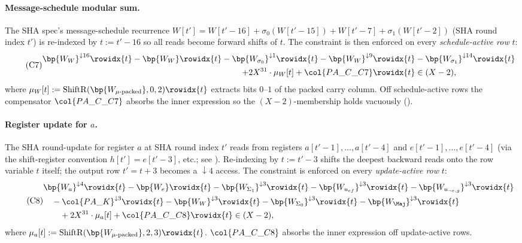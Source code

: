 \paragraph{Message-schedule modular sum.}

The SHA spec's message-schedule recurrence
$W[t'] = W[t'-16] + \sigma_0(W[t'-15]) + W[t'-7] + \sigma_1(W[t'-2])$
(SHA round index $t'$) is re-indexed by $t := t' - 16$ so all reads
become forward shifts of $t$. The constraint is then enforced on
every \emph{schedule-active row} $t$:
\begin{equation}\tag{C7}\label{con:c7}
\begin{aligned}
\bp{W_W}^{\downarrow 16}\rowidx{t}
  - \bp{W_W}\rowidx{t}
  - \bp{W_{\sigma_0}}^{\downarrow 1}\rowidx{t}
  - \bp{W_W}^{\downarrow 9}\rowidx{t}
  &- \bp{W_{\sigma_1}}^{\downarrow 14}\rowidx{t} \\
  + 2X^{31} \cdot \mu_W[t] + \col{PA\_C\_C7}\rowidx{t} &\in (X-2),
\end{aligned}
\end{equation}
where $\mu_W[t] := \mathrm{ShiftR}(\bp{W_{\mu\text{-packed}}}, 0, 2)\rowidx{t}$
extracts bits $0$--$1$ of the packed carry column. Off
schedule-active rows the compensator $\col{PA\_C\_C7}$ absorbs the
inner expression so the $(X-2)$-membership holds vacuously
().

\paragraph{Register update for $a$.}

The SHA round-update for register $a$ at SHA round index $t'$ reads
from registers $a[t'-1], \ldots, a[t'-4]$ and $e[t'-1], \ldots, e[t'-4]$
(via the shift-register convention $h[t'] = e[t'-3]$, etc.; see
). Re-indexing by $t := t' - 3$ shifts the
deepest backward reads onto the row variable $t$ itself; the output
row $t' = t + 3$ becomes a $\downarrow 4$ access. The constraint is
enforced on every \emph{update-active row} $t$:
\begin{equation}\tag{C8}\label{con:c8}
\begin{aligned}
&\bp{W_a}^{\downarrow 4}\rowidx{t}
  - \bp{W_e}\rowidx{t}
  - \bp{W_{\Sigma_1}}^{\downarrow 3}\rowidx{t}
  - \bp{W_{u_{ef}}}^{\downarrow 3}\rowidx{t}
  - \bp{W_{u_{\neg e,g}}}^{\downarrow 3}\rowidx{t} \\
&\quad - \col{PA\_K}^{\downarrow 3}\rowidx{t}
  - \bp{W_W}^{\downarrow 3}\rowidx{t}
  - \bp{W_{\Sigma_0}}^{\downarrow 3}\rowidx{t}
  - \bp{W_{\Maj}}^{\downarrow 3}\rowidx{t} \\
&\qquad + 2X^{31} \cdot \mu_a[t] + \col{PA\_C\_C8}\rowidx{t} \in (X-2),
\end{aligned}
\end{equation}
where $\mu_a[t] := \mathrm{ShiftR}(\bp{W_{\mu\text{-packed}}}, 2, 3)\rowidx{t}$.
$\col{PA\_C\_C8}$ absorbs the inner expression off update-active
rows.

